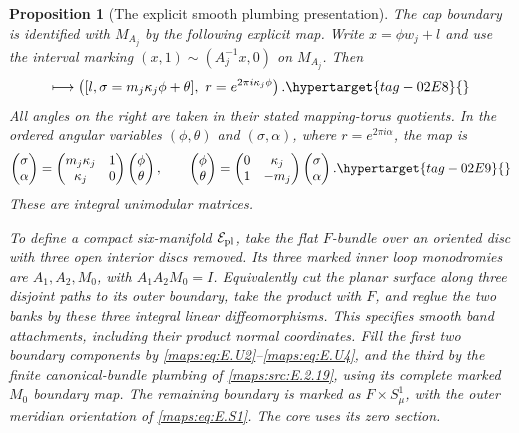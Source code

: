 \documentclass[11pt,a4paper]{article}
\numberwithin{equation}{section}
\newtheorem{proposition}[proposition]{Proposition}
\theoremstyle{definition}
\begin{document}
\begin{proposition}[The explicit smooth plumbing presentation]
The cap boundary is identified with $M_{A_j}$ by the following
explicit map.  Write $x=\phi w_j+l$ and use the interval marking
$(x,1)\sim(A_j^{-1}x,0)$ on $M_{A_j}$.  Then
\begin{equation}
 [x,\theta]\longmapsto
 \left([l,\sigma=m_j\kappa_j\phi+\theta],
                         \ r=e^{2\pi i\kappa_j\phi}\right).
 \hypertarget{tag-02E8}{}\label{maps:eq:E.U3}
\end{equation}
All angles on the right are taken in their stated mapping-torus
quotients.  In the ordered angular variables $(\phi,\theta)$
and $(\sigma,\alpha)$, where $r=e^{2\pi i\alpha}$, the map is
\begin{equation}
 \begin{pmatrix}\sigma\\\alpha\end{pmatrix}
 =
 \begin{pmatrix}m_j\kappa_j&1\\\kappa_j&0\end{pmatrix}
 \begin{pmatrix}\phi\\\theta\end{pmatrix},
 \qquad
 \begin{pmatrix}\phi\\\theta\end{pmatrix}
 =
 \begin{pmatrix}0&\kappa_j\\1&-m_j\end{pmatrix}
 \begin{pmatrix}\sigma\\\alpha\end{pmatrix}.
 \hypertarget{tag-02E9}{}\label{maps:eq:E.U4}
\end{equation}
These are integral unimodular matrices.

To define a compact six-manifold $\mathcal E_{\rm pl}$, take the
flat $F$-bundle over an oriented disc with three open interior
discs removed.  Its three marked inner loop monodromies are
$A_1,A_2,M_0$, with $A_1A_2M_0=I$.  Equivalently cut the planar
surface along three disjoint paths to its outer boundary, take
the product with $F$, and reglue the two banks by these three
integral linear diffeomorphisms.  This specifies smooth band
attachments, including their product normal coordinates.
Fill the first two boundary components by \eqref{maps:eq:E.U2}--\eqref{maps:eq:E.U4}, and
the third by the finite canonical-bundle plumbing of \ref{maps:src:E.2.19},
using its complete marked $M_0$ boundary map.  The remaining
boundary is marked as $F\times S^1_\mu$, with the outer meridian
orientation of \eqref{maps:eq:E.S1}.  The core uses its zero section.


\end{proposition}
\end{document}
